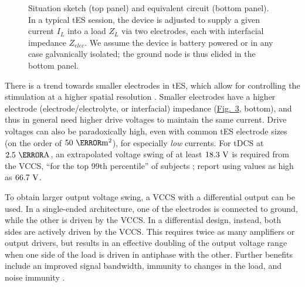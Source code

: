 \documentclass[10pt]{article}
\newcommand{\brieffiglink}[1]{\hyperref[#1]{Fig.~\ref*{#1}}}
\begin{document}
\begin{figure}[bt]
	\begin{subfigure}{\textwidth}
        \centering
{}
        \caption{}
        \label{fig:situation_sketch1}
    \end{subfigure}

	\begin{subfigure}{\textwidth}
        \centering
\makebox[\textwidth][c]{%

}
        \caption*{\small}
        \label{fig:situation_sketch2}
    \end{subfigure}
\caption{\small Situation sketch (top panel) and equivalent circuit (bottom panel). In a typical tES session, the device is adjusted to supply a given current $I_L$ into a load $Z_L$ via two electrodes, each with interfacial impedance $Z_{elec}$. We assume the device is battery powered or in any case galvanically isolated; the ground node is thus elided in the bottom panel.}
\label{fig:situation_sketch}
\end{figure}

There is a trend towards smaller electrodes in tES, which allow for controlling the stimulation at a higher spatial resolution \cite{pmid23031743}. Smaller electrodes have a higher electrode (electrode/electrolyte, or interfacial) impedance (\brieffiglink{fig:situation_sketch}, bottom), and thus in general need higher drive voltages to maintain the same current. Drive voltages can also be paradoxically high, even with common tES electrode sizes (on the order of $50~\centi\meter^2$), for especially \emph{low} currents. For tDCS at $2.5~\milli\ampere$, an extrapolated voltage swing of at least $18.3~\volt$ is required from the VCCS, ``for the top 99th percentile'' of subjects \cite{pmid25018056}; \cite{pmid20488204} report using values as high as $66.7~\volt$.

To obtain larger output voltage swing, a VCCS with a differential output can be used. In a single-ended architecture, one of the electrodes is connected to ground, while the other is driven by the VCCS. In a differential design, instead, both sides are actively driven by the VCCS. This requires twice as many amplifiers or output drivers, but results in an effective doubling of the output voltage range when one side of the load is driven in antiphase with the other. Further benefits include an improved signal bandwidth, immunity to changes in the load, and noise immunity \cite{pmid24880419}.
\end{document}
